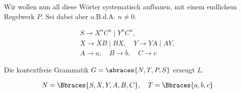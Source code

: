 \begin{solution}
Wir wollen nun all diese Wörter systematisch aufbauen, mit einem endlichem Regelwerk $P$.
Sei dabei aber o.B.d.A. $n \neq 0$.

\begin{gather*}
    S \to X^n C^n \mid Y^n C^n, \\
    X \to X B \mid B X, \quad Y \to Y A \mid A Y, \\
    A \to a, \quad B \to b, \quad C \to c
\end{gather*}

Die kontextfreie Grammatik $G = \abraces{N, T, P, S}$ erzeugt $L$.

\begin{align*}
    N = \Bbraces{S, X, Y, A, B, C},
    \quad
    T = \Bbraces{a, b, c}
\end{align*}

\end{solution}

